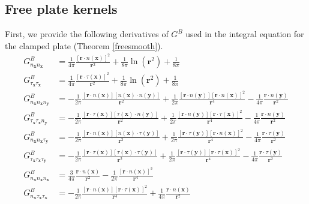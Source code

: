 \documentclass[preprint,12pt,3p]{elsarticle}
\begin{document}
\subsection{Free plate kernels} \label{appfree}
First, we provide the following derivatives of $G^{B}$ used in the integral equation for the clamped plate (Theorem \ref{freesmooth}).
\begin{align}
    G^{B}_{n_\mathbf{x} n_\mathbf{x}} &= \frac{1}{4\pi} \frac{[\pmb{r}\cdot  n(\mathbf{x}) ]^2}{\pmb{r}^2} + \frac{1}{8\pi}\ln(\pmb{r}^2) + \frac{1}{8\pi} \\
    G^{B}_{\tau_\mathbf{x} \tau_\mathbf{x}} &= \frac{1}{4\pi} \frac{[\pmb{r}\cdot \tau(\mathbf{x})]^2}{\pmb{r}^2} + \frac{1}{8\pi}\ln(\pmb{r}^2) + \frac{1}{8\pi}\\
    G^{B}_{n_\mathbf{x} n_\mathbf{x} n_\mathbf{y}} &= -\frac{1}{2\pi} \frac{[\pmb{r}\cdot n(\mathbf{x})][n(\mathbf{x}) \cdot  n(\mathbf{y}) ]}{\pmb{r}^2} + \frac{1}{2\pi} \frac{[\pmb{r}\cdot  n(\mathbf{y}) ][\pmb{r}\cdot n(\mathbf{x})]^2}{\pmb{r}^4} -\frac{1}{4\pi}\frac{\pmb{r}\cdot  n(\mathbf{y}) }{\pmb{r}^2}\\
    G^{B}_{\tau_\mathbf{x} \tau_\mathbf{x} n_\mathbf{y}} &= -\frac{1}{2\pi} \frac{[\pmb{r}\cdot \tau(\mathbf{x})][\tau(\mathbf{x}) \cdot  n(\mathbf{y}) ]}{\pmb{r}^2} + \frac{1}{2\pi} \frac{[\pmb{r}\cdot  n(\mathbf{y}) ][\pmb{r}\cdot \tau(\mathbf{x})]^2}{\pmb{r}^4} -\frac{1}{4\pi}\frac{\pmb{r}\cdot  n(\mathbf{y}) }{\pmb{r}^2}\\
    G^{B}_{n_\mathbf{x} n_\mathbf{x} \tau_\mathbf{y}} &= -\frac{1}{2\pi} \frac{[\pmb{r}\cdot  n(\mathbf{x}) ][ n(\mathbf{x})  \cdot  \tau(\mathbf{y}) ]}{\pmb{r}^2} + \frac{1}{2\pi} \frac{[\pmb{r}\cdot  \tau(\mathbf{y}) ][\pmb{r}\cdot  n(\mathbf{x}) ]^2}{\pmb{r}^4} -\frac{1}{4\pi}\frac{\pmb{r}\cdot  \tau(\mathbf{y}) }{\pmb{r}^2}\\
     G^{B}_{\tau_\mathbf{x} \tau_\mathbf{x} \tau_\mathbf{y}} &= -\frac{1}{2\pi} \frac{[\pmb{r}\cdot \tau(\mathbf{x})][\tau(\mathbf{x}) \cdot  \tau(\mathbf{y}) ]}{\pmb{r}^2} + \frac{1}{2\pi} \frac{[\pmb{r}\cdot  \tau(\mathbf{y}) ][\pmb{r}\cdot \tau(\mathbf{x})]^2}{\pmb{r}^4} -\frac{1}{4\pi}\frac{\pmb{r}\cdot  \tau(\mathbf{y}) }{\pmb{r}^2}\\
    G^{B}_{n_\mathbf{x} n_\mathbf{x} n_\mathbf{x}} &= \frac{3}{4\pi} \frac{\pmb{r}\cdot n(\mathbf{x})}{\pmb{r}^2} - \frac{1}{2\pi} \frac{[\pmb{r}\cdot n(\mathbf{x})]^3}{\pmb{r}^4} \\
    G^{B}_{n_\mathbf{x} \tau_\mathbf{x} \tau_\mathbf{x} } &=  - \frac{1}{2\pi} \frac{[\pmb{r}\cdot  n(\mathbf{x}) ][\pmb{r}\cdot \tau(\mathbf{x})]^2}{\pmb{r}^4} +\frac{1}{4\pi}\frac{\pmb{r}\cdot  n(\mathbf{x}) }{\pmb{r}^2}\\

\end{align}
\end{document}

